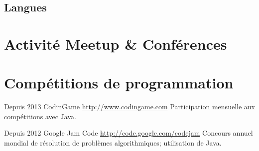 \documentclass[11pt,a4paper]{moderncv}
\begin{document}
\subsection{Langues}



\section{Activité Meetup \& Conférences}

\section{Compétitions de programmation}

\cventry
{Depuis 2013}
{CodinGame}
{}
{\url{http://www.codingame.com}}
{}
{Participation mensuelle aux compétitions avec Java.}

\cventry
{Depuis 2012}
{Google Jam Code}
{}
{\url{http://code.google.com/codejam}}
{}
{Concours annuel mondial de résolution de problèmes algorithmiques; utilisation de Java.}



\end{document}
